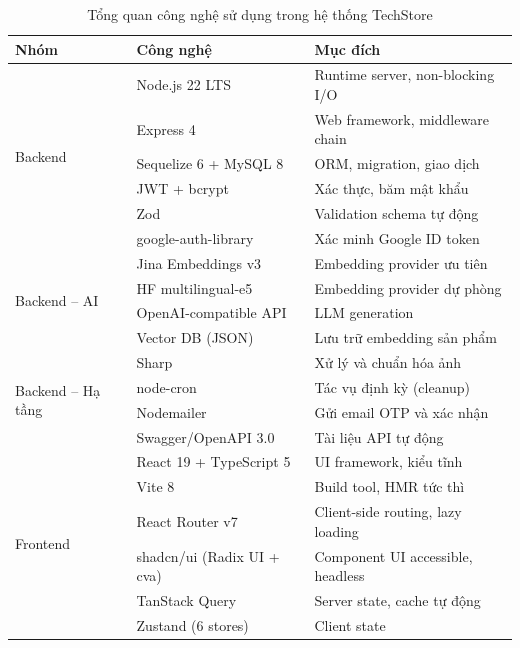 \begin{table}[H]
  \centering
  \caption{Tổng quan công nghệ sử dụng trong hệ thống TechStore}
  \label{tab:tech_stack}
  \footnotesize
  \begin{tabular}{|l|l|p{6cm}|}
    \hline
    \textbf{Nhóm} & \textbf{Công nghệ} & \textbf{Mục đích} \\
    \hline
    \multirow{6}{*}{Backend} & Node.js 22 LTS & Runtime server, non-blocking I/O \\
    \cline{2-3}
    & Express 4 & Web framework, middleware chain \\
    \cline{2-3}
    & Sequelize 6 + MySQL 8 & ORM, migration, giao dịch \\
    \cline{2-3}
    & JWT + bcrypt & Xác thực, băm mật khẩu \\
    \cline{2-3}
    & Zod & Validation schema tự động \\
    \cline{2-3}
    & google-auth-library & Xác minh Google ID token \\
    \hline
    \multirow{4}{*}{Backend -- AI} & Jina Embeddings v3 & Embedding provider ưu tiên \\
    \cline{2-3}
    & HF multilingual-e5 & Embedding provider dự phòng \\
    \cline{2-3}
    & OpenAI-compatible API & LLM generation \\
    \cline{2-3}
    & Vector DB (JSON) & Lưu trữ embedding sản phẩm \\
    \hline
    \multirow{4}{*}{Backend -- Hạ tầng} & Sharp & Xử lý và chuẩn hóa ảnh \\
    \cline{2-3}
    & node-cron & Tác vụ định kỳ (cleanup) \\
    \cline{2-3}
    & Nodemailer & Gửi email OTP và xác nhận \\
    \cline{2-3}
    & Swagger/OpenAPI 3.0 & Tài liệu API tự động \\
    \hline
    \multirow{10}{*}{Frontend} & React 19 + TypeScript 5 & UI framework, kiểu tĩnh \\
    \cline{2-3}
    & Vite 8 & Build tool, HMR tức thì \\
    \cline{2-3}
    & React Router v7 & Client-side routing, lazy loading \\
    \cline{2-3}
    & shadcn/ui (Radix UI + cva) & Component UI accessible, headless \\
    \cline{2-3}
    & TanStack Query & Server state, cache tự động \\
    \cline{2-3}
    & Zustand (6 stores) & Client state \\

\end{tabular}
\end{table}
